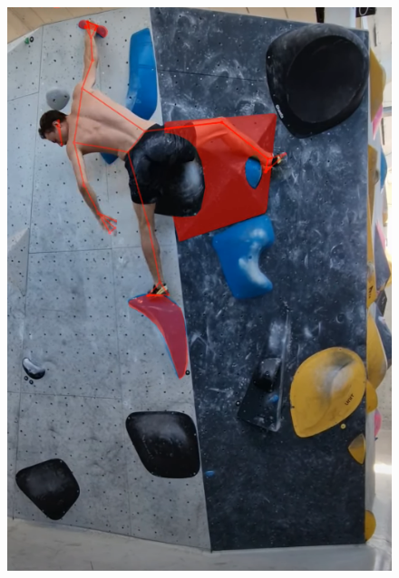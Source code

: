 \documentclass{beamer}
\begin{document}
\begin{frame}
\begin{minipage}{0.45\textwidth}
\begin{figure}
            \includegraphics[width = \textwidth]{./entities/ClimbAlong_cv.PNG}
        \end{figure}
    \end{minipage}
\end{frame}
\end{document}
